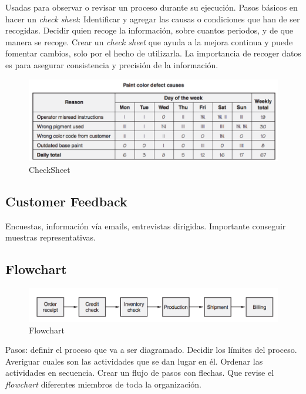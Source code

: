 \documentclass[]{article}
\begin{document}
Usadas para observar o revisar un proceso durante su ejecución. Pasos básicos en hacer un \textit{check sheet}: Identificar y agregar las causas o condiciones que han de ser recogidas. Decidir quien recoge la información, sobre cuantos periodos, y de que manera se recoge. Crear un \textit{check sheet} que ayuda a la mejora continua y puede fomentar cambios, solo por el hecho de utilizarla. La importancia de recoger datos es para asegurar consistencia y precisión de la información.

\begin{figure}[H]
	\centering
	\includegraphics[width=120mm]{imagenes/CheckSheet.png}
	\caption{CheckSheet}
	\label{fig:CheckSheet}
\end{figure}

\subsection{Customer Feedback}

Encuestas, información vía emails, entrevistas dirigidas. Importante conseguir muestras representativas.

\subsection{Flowchart}

\begin{figure}[H]
	\centering
	\includegraphics[width=120mm]{imagenes/Flowchart.png}
	\caption{Flowchart}
	\label{fig:Flowchart}
\end{figure}

Pasos: definir el proceso que va a ser diagramado. Decidir los límites del proceso. Averiguar cuales son las actividades que se dan lugar en él. Ordenar las actividades en secuencia. Crear un flujo de pasos con flechas. Que revise el \textit{flowchart} diferentes miembros de toda la organización.
\end{document}
